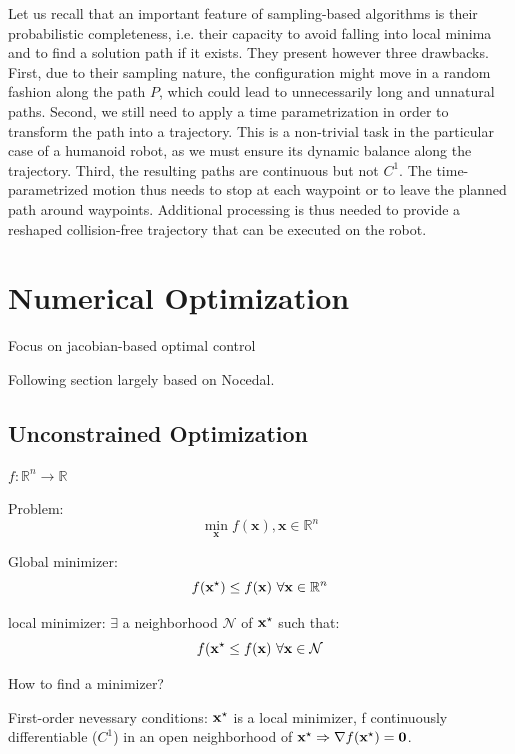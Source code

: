 Let us recall that an important feature of sampling-based algorithms
is their probabilistic completeness, i.e. their capacity to avoid
falling into local minima and to find a solution path if it
exists. They present however three drawbacks. First, due to their
sampling nature, the configuration \config{} might move in a random
fashion along the path $P$, which could lead to unnecessarily long and
unnatural paths. Second, we still need to apply a time parametrization
in order to transform the path into a trajectory. This is a
non-trivial task in the particular case of a humanoid robot, as we
must ensure its dynamic balance along the trajectory. Third, the
resulting paths are continuous but not $C^1$. The time-parametrized
motion thus needs to stop at each waypoint or to leave the planned
path around waypoints. Additional processing is thus needed to provide
a reshaped collision-free trajectory that can be executed on the
robot.

\section{Numerical Optimization}

Focus on jacobian-based optimal control

Following section largely based on Nocedal.

\subsection{Unconstrained Optimization}

$f:\mathbb R^n \rightarrow \mathbb R$

Problem:
\begin{equation}
\min_{\mathbf{x}}f(\mathbf{x}), \mathbf{x} \in \mathbb R^n
\end{equation}

Global minimizer:
\begin{equation}
f(\mathbf{x}^{\star}) \le f(\mathbf{x})~\forall \mathbf{x} \in \mathbb R^n
\end{equation}

local minimizer: $\exists$ a neighborhood $\mathcal{N}$ of
$\mathbf{x}^{\star}$ such that:
\begin{equation}
  f(\mathbf{x}^{\star} \le f(\mathbf{x})~\forall \mathbf{x} \in \mathcal{N}
\end{equation}

How to find a minimizer?

First-order nevessary conditions:
$\mathbf{x}^{\star}$ is a local minimizer, f continuously differentiable
($C^1$) in an open neighborhood of $\mathbf{x}^{\star} \Rightarrow
\nabla f(\mathbf{x}^{\star}) = \mathbf{0}$.


